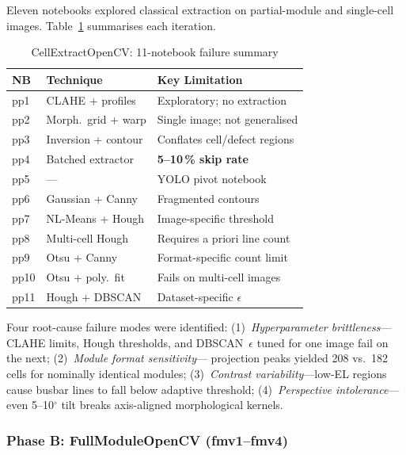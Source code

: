 \documentclass[conference]{IEEEtran}
\begin{document}
Eleven notebooks explored classical extraction on
partial-module and single-cell images.
Table~\ref{tab:classical_cell} summarises each iteration.

\begin{table}[t]
  \caption{CellExtractOpenCV: 11-notebook failure summary}
  \label{tab:classical_cell}
  \begin{center}
  \renewcommand{\arraystretch}{1.05}
  \small
  \begin{tabular}{p{0.7cm}p{1.9cm}p{3.6cm}}
    \toprule
    \textbf{NB} & \textbf{Technique} & \textbf{Key Limitation} \\
    \midrule
    pp1  & CLAHE + profiles     & Exploratory; no extraction \\
    pp2  & Morph.\ grid + warp  & Single image; not generalised \\
    pp3  & Inversion + contour  & Conflates cell/defect regions \\
    pp4  & Batched extractor    & \textbf{5--10\,\% skip rate} \\
    pp5  & ---                  & YOLO pivot notebook \\
    pp6  & Gaussian + Canny     & Fragmented contours \\
    pp7  & NL-Means + Hough     & Image-specific threshold \\
    pp8  & Multi-cell Hough     & Requires a priori line count \\
    pp9  & Otsu + Canny         & Format-specific count limit \\
    pp10 & Otsu + poly.\ fit    & Fails on multi-cell images \\
    pp11 & Hough + DBSCAN       & Dataset-specific $\epsilon$ \\
    \bottomrule
  \end{tabular}
  \end{center}
\end{table}

Four root-cause failure modes were identified:
(1)~\textit{Hyperparameter brittleness}---CLAHE limits,
Hough thresholds, and DBSCAN~$\epsilon$ tuned for one image
fail on the next; (2)~\textit{Module format sensitivity}---
projection peaks yielded 208 vs.\ 182 cells for nominally
identical modules; (3)~\textit{Contrast variability}---low-EL
regions cause busbar lines to fall below adaptive threshold;
(4)~\textit{Perspective intolerance}---even 5--10$^\circ$
tilt breaks axis-aligned morphological kernels.

\subsubsection{Phase B: FullModuleOpenCV (fmv1--fmv4)}
\end{document}
